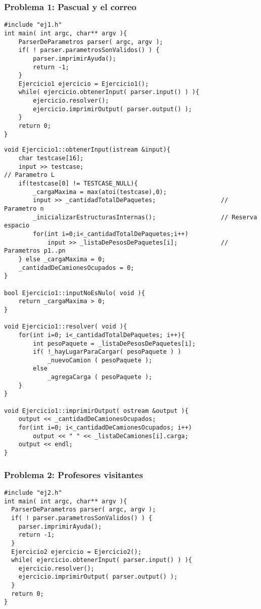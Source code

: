 \documentclass[11pt, a4paper, twoside]{article}
\begin{document}
{}


\subsubsection{Problema 1: Pascual y el correo}

\begin{lstlisting}
#include "ej1.h"
int main( int argc, char** argv ){
	ParserDeParametros parser( argc, argv );
	if( ! parser.parametrosSonValidos() ) {
		parser.imprimirAyuda();
		return -1;
	}
	Ejercicio1 ejercicio = Ejercicio1();
	while( ejercicio.obtenerInput( parser.input() ) ){
		ejercicio.resolver();
		ejercicio.imprimirOutput( parser.output() );
	}
	return 0;
}
\end{lstlisting}

\begin{lstlisting}
void Ejercicio1::obtenerInput(istream &input){
	char testcase[16];
	input >> testcase;														// Parametro L
	if(testcase[0] != TESTCASE_NULL){
		_cargaMaxima = max(atoi(testcase),0);
		input >> _cantidadTotalDePaquetes;					// Parametro n
		_inicializarEstructurasInternas();					// Reserva espacio
		for(int i=0;i<_cantidadTotalDePaquetes;i++)
			input >> _listaDePesosDePaquetes[i];			// Parametros p1..pn
	} else _cargaMaxima = 0;
	_cantidadDeCamionesOcupados = 0;
}

bool Ejercicio1::inputNoEsNulo( void ){
	return _cargaMaxima > 0;
}

void Ejercicio1::resolver( void ){
	for(int i=0; i<_cantidadTotalDePaquetes; i++){
		int pesoPaquete = _listaDePesosDePaquetes[i];
		if( !_hayLugarParaCargar( pesoPaquete ) )
			_nuevoCamion ( pesoPaquete );
		else
			_agregaCarga ( pesoPaquete );
	}
}

void Ejercicio1::imprimirOutput( ostream &output ){
	output << _cantidadDeCamionesOcupados;
	for(int i=0; i<_cantidadDeCamionesOcupados; i++)
		output << " " << _listaDeCamiones[i].carga;
	output << endl;
}
\end{lstlisting}

\clearpage
\subsubsection{Problema 2: Profesores visitantes}

\begin{lstlisting}
#include "ej2.h"
int main( int argc, char** argv ){
  ParserDeParametros parser( argc, argv );
  if( ! parser.parametrosSonValidos() ) {
    parser.imprimirAyuda();
    return -1;
  }
  Ejercicio2 ejercicio = Ejercicio2();
  while( ejercicio.obtenerInput( parser.input() ) ){
    ejercicio.resolver();
    ejercicio.imprimirOutput( parser.output() );
  }
  return 0;
}
\end{lstlisting}
\end{document}
